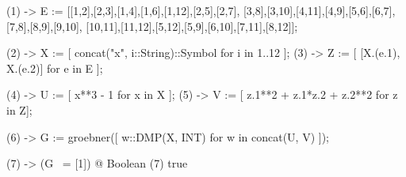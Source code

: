 \begin{python}
(1) -> E := [[1,2],[2,3],[1,4],[1,6],[1,12],[2,5],[2,7],
[3,8],[3,10],[4,11],[4,9],[5,6],[6,7],[7,8],[8,9],[9,10],
[10,11],[11,12],[5,12],[5,9],[6,10],[7,11],[8,12]];

(2) -> X := [ concat("x", i::String)::Symbol for i in 1..12 ];
(3) -> Z := [ [X.(e.1), X.(e.2)] for e in E ];

(4) -> U := [ x**3 - 1 for x in X ];
(5) -> V := [ z.1**2 + z.1*z.2 + z.2**2 for z in Z];

(6) -> G := groebner([ w::DMP(X, INT) for w in concat(U, V) ]);

(7) -> (G ~= [1]) @ Boolean
   (7) true
\end{python}

